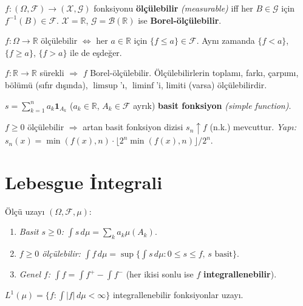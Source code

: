 \begin{tanim}\label{app:def:olculebilir_fon}
$f:(\Omega,\mathcal{F})\to(\mathcal{X},\mathcal{G})$ fonksiyonu \textbf{ölçülebilir} \emph{(measurable)} iff her $B\in\mathcal{G}$ için $f^{-1}(B)\in\mathcal{F}$. $\mathcal{X}=\mathbb{R}$, $\mathcal{G}=\mathcal{B}(\mathbb{R})$ ise \textbf{Borel-ölçülebilir}.
\end{tanim}

\begin{teorem}
$f:\Omega\to\mathbb{R}$ ölçülebilir $\iff$ her $a\in\mathbb{R}$ için $\{f\leq a\}\in\mathcal{F}$. Aynı zamanda $\{f<a\}$, $\{f\geq a\}$, $\{f>a\}$ ile de eşdeğer.
\end{teorem}

\begin{sonuc}
$f:\mathbb{R}\to\mathbb{R}$ sürekli $\Rightarrow$ $f$ Borel-ölçülebilir. Ölçülebilirlerin toplamı, farkı, çarpımı, bölümü (sıfır dışında), $\limsup$'ı, $\liminf$'i, limiti (varsa) ölçülebilirdir.
\end{sonuc}

\begin{tanim}\label{app:def:basit}
$s = \sum_{k=1}^n a_k\mathbf{1}_{A_k}$ ($a_k\in\mathbb{R}$, $A_k\in\mathcal{F}$ ayrık) \textbf{basit fonksiyon} \emph{(simple function)}.
\end{tanim}

\begin{teorem}\label{app:thm:basit_yakin}
$f\geq0$ ölçülebilir $\Rightarrow$ artan basit fonksiyon dizisi $s_n\uparrow f$ (n.k.) mevcuttur. \textit{Yapı:} $s_n(x) = \min(f(x),n)\cdot\lfloor 2^n\min(f(x),n)\rfloor / 2^n$.
\end{teorem}

\section{Lebesgue İntegrali}
\label{app:lebesgue_integral}

\begin{tanim}\label{app:def:integral}
Ölçü uzayı $(\Omega,\mathcal{F},\mu)$:
\begin{enumerate}[(1)]
  \item \textit{Basit $s\geq0$:} $\int s\,d\mu = \sum_k a_k\mu(A_k)$.
  \item \textit{$f\geq0$ ölçülebilir:} $\int f\,d\mu = \sup\{\int s\,d\mu: 0\leq s\leq f,\,s\text{ basit}\}$.
  \item \textit{Genel $f$:} $\int f = \int f^+ - \int f^-$ (her ikisi sonlu ise $f$ \textbf{integrallenebilir}).
\end{enumerate}
$L^1(\mu) = \{f: \int|f|\,d\mu < \infty\}$ integrallenebilir fonksiyonlar uzayı.
\end{tanim}

